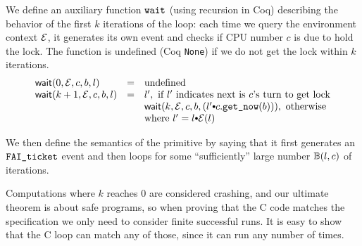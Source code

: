{We define an auxiliary function $\comm{wait}$
(using recursion in Coq) describing the behavior of the first $k$
iterations of the loop: each time we query the environment
context $\oracle$, it generates its own
event and checks if CPU number $c$ is due to hold the
lock. The function is undefined (Coq {\tt None}) if we do not get the
lock within $k$ iterations.
\[
\begin{array}{lcl}
\mathsf{wait}(0, \oracle, c, b, l) & = &\text{undefined} \\
\mathsf{wait}(k+1, \oracle, c, b, l) & = & l', \text{ if $l'$ indicates next is $c$'s turn to get lock}\\
                       & &   \mathsf{wait}(k, \oracle, c,  b, (l' \cons c.\getnow(b))), \text{ otherwise} \\
                       & &  \text{where }l' = l \cons  \oracle(l)
\end{array}
\]%

We then define the semantics of the primitive by saying that it first
generates an $\incticket$ event and then loops
for some ``sufficiently'' large number $\calwait(l, c)$ of iterations.
\begin{mathpar}
\end{mathpar}%
Computations where $k$ reaches 0 are considered crashing, and our
ultimate theorem is about safe programs, so when proving that the C
code matches the specification we only need to consider finite
successful runs. It is easy to show that the C loop can match any of
those, since it can run any number of times.

}
